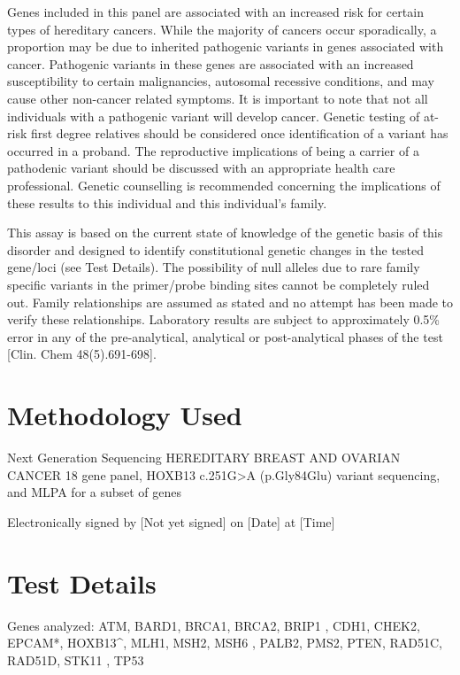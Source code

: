 \documentclass[9pt]{extarticle}
\begin{document}
Genes included in this panel are associated with an increased risk for certain types of hereditary cancers. While the majority of cancers occur sporadically, a proportion may be due to inherited pathogenic variants in genes associated with cancer. Pathogenic variants in these genes are associated with an increased susceptibility to certain malignancies, autosomal recessive conditions, and may cause other non-cancer related symptoms. It is important to note that not all individuals with a pathogenic variant will develop cancer. Genetic testing of at-risk first degree relatives should be considered once identification of a variant has occurred in a proband. The reproductive implications of being a carrier of a pathodenic variant should be discussed with an appropriate health care professional. Genetic counselling is recommended concerning the implications of these results to this individual and this individual's family.

This assay is based on the current state of knowledge of the genetic basis of this disorder and designed to identify constitutional genetic changes in the tested gene/loci (see Test Details). The possibility of null alleles due to rare family specific variants in the primer/probe binding sites cannot be completely ruled out. Family relationships are assumed as stated and no attempt has been made to verify these relationships. Laboratory results are subject to approximately 0.5\% error in any of the pre-analytical, analytical or post-analytical phases of the test [Clin. Chem 48(5).691-698]. 

\section*{Methodology Used}
Next Generation Sequencing 
HEREDITARY BREAST AND OVARIAN CANCER 18 gene panel, HOXB13 c.251G>A (p.Gly84Glu) variant sequencing, and MLPA for a subset of genes 
\begin{flushright}
Electronically signed by [Not yet signed] on [Date] at [Time]
\end{flushright}

\section*{Test Details}
Genes analyzed: ATM, BARD1, BRCA1, BRCA2, BRIP1 , CDH1, CHEK2, EPCAM*, HOXB13\^{}, MLH1, MSH2, MSH6 , PALB2, PMS2, PTEN, RAD51C, RAD51D, STK11 , TP53
\end{document}
